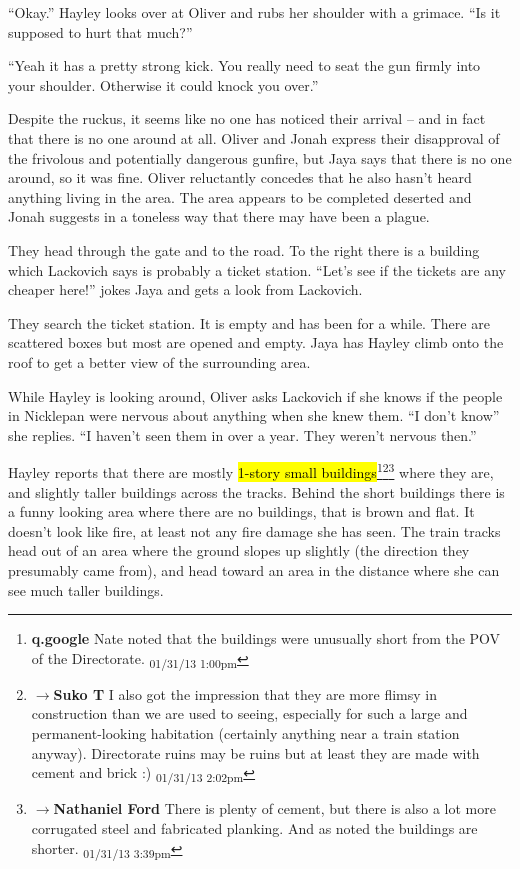``Okay.''  Hayley looks over at Oliver and rubs her shoulder with a grimace.  ``Is it supposed to hurt that much?''

``Yeah it has a pretty strong kick.  You really need to seat the gun firmly into your shoulder.  Otherwise it could knock you over.''



Despite the ruckus, it seems like no one has noticed their arrival -- and in fact that there is no one around at all.  Oliver and Jonah express their disapproval of the frivolous and potentially dangerous gunfire, but Jaya says that there is no one around, so it was fine.  Oliver reluctantly concedes that he also hasn't heard anything living in the area.  The area appears to be completed deserted and Jonah suggests in a toneless way that there may have been a plague. 



They head through the gate and to the road.  To the right there is a building which Lackovich says is probably a ticket station.  ``Let's see if the tickets are any cheaper here!'' jokes Jaya and gets a look from Lackovich.



They search the ticket station.  It is empty and has been for a while.  There are scattered boxes but most are opened and empty.  Jaya has Hayley climb onto the roof to get a better view of the surrounding area.



While Hayley is looking around, Oliver asks Lackovich if she knows if the people in Nicklepan were nervous about anything when she knew them.  ``I don't know'' she replies.  ``I haven't seen them in over a year.  They weren't nervous then.''



Hayley reports that there are mostly \hl{1-story small buildings}\footnote{\textbf{q.google }Nate noted that the buildings were unusually short from the POV of the Directorate. \textsubscript{01/31/13 1:00pm}}\footnote{$\rightarrow$\textbf{Suko T }I also got the impression that they are more flimsy in construction than we are used to seeing, especially for such a large and permanent-looking habitation (certainly anything near a train station anyway).  Directorate ruins may be ruins but at least they are made with cement and brick :) \textsubscript{01/31/13 2:02pm}}\footnote{$\rightarrow$\textbf{Nathaniel Ford }There is plenty of cement, but there is also a lot more corrugated steel and fabricated planking. And as noted the buildings are shorter. \textsubscript{01/31/13 3:39pm}} where they are, and slightly taller buildings across the tracks.  Behind the short buildings there is a funny looking area where there are no buildings, that is brown and flat.  It doesn't look like fire, at least not any fire damage she has seen.  The train tracks head out of an area where the ground slopes up slightly (the direction they presumably came from), and head toward an area in the distance where she can see much taller buildings.



